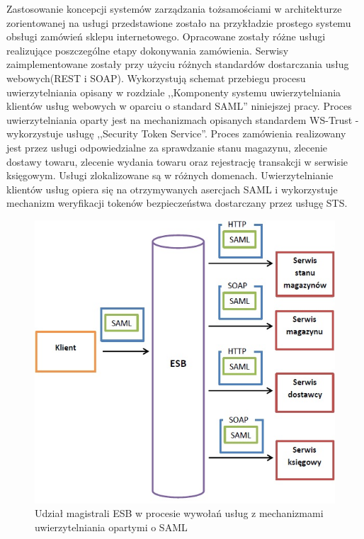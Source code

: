 		Zastosowanie koncepcji systemów zarządzania tożsamościami w architekturze zorientowanej na usługi przedstawione zostało na przykładzie prostego systemu obsługi zamówień sklepu internetowego. Opracowane zostały różne usługi realizujące poszczególne etapy dokonywania zamówienia. Serwisy zaimplementowane zostały przy użyciu różnych standardów dostarczania usług webowych(REST i SOAP). Wykorzystują schemat przebiegu procesu uwierzytelniania opisany w rozdziale ,,Komponenty systemu uwierzytelniania klientów usług webowych w oparciu o standard SAML'' niniejszej pracy. Proces uwierzytelniania oparty jest na mechanizmach opisanych standardem WS-Trust - wykorzystuje usługę ,,Security Token Service''. Proces zamówienia realizowany jest przez usługi odpowiedzialne za sprawdzanie stanu magazynu, zlecenie dostawy towaru, zlecenie wydania towaru  oraz rejestrację transakcji w serwisie księgowym. Usługi zlokalizowane są w różnych domenach. Uwierzytelnianie klientów usług opiera się na otrzymywanych asercjach SAML i wykorzystuje mechanizm weryfikacji tokenów bezpieczeństwa dostarczany przez usługę STS. 

		\begin{figure}[h]
			\centering
			\includegraphics{img/esbAndSAML.jpg}
			\caption{Udział magistrali ESB w procesie wywołań usług z mechanizmami uwierzytelniania opartymi o SAML}
			\label{ESB i SAML}
		\end{figure}

